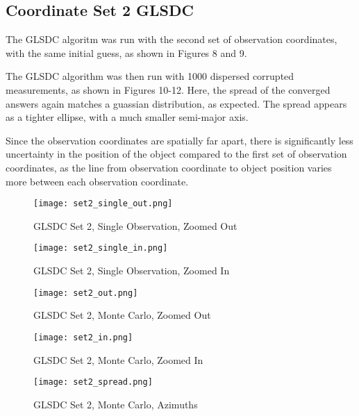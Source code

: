\documentclass{article}
\begin{document}
\subsection{Coordinate Set 2 GLSDC}
The GLSDC algoritm was run with the second set of observation coordinates, with the same initial guess, as shown in Figures 8 and 9.
\par The GLSDC algorithm was then run with 1000 dispersed corrupted measurements, as shown in Figures 10-12. Here, the spread of the converged answers again matches a guassian distribution, as expected. The spread appears as a tighter ellipse, with a much smaller semi-major axis. 
\par Since the observation coordinates are spatially far apart, there is significantly less uncertainty in the position of the object compared to the first set of observation coordinates, as the line from observation coordinate to object position varies more between each observation coordinate.

\begin{figure}[h]
    \centering
    \texttt{[image: set2\_single\_out.png]}
    \caption{GLSDC Set 2, Single Observation, Zoomed Out}
    \label{fig:enter-label}
\end{figure}

\begin{figure}[h]
    \centering
    \texttt{[image: set2\_single\_in.png]}
    \caption{GLSDC Set 2, Single Observation, Zoomed In}
    \label{fig:enter-label}
\end{figure}

\begin{figure}[h]
    \centering
    \texttt{[image: set2\_out.png]}
    \caption{GLSDC Set 2, Monte Carlo, Zoomed Out}
    \label{fig:enter-label}
\end{figure}

\begin{figure}[h]
    \centering
    \texttt{[image: set2\_in.png]}
    \caption{GLSDC Set 2, Monte Carlo, Zoomed In}
    \label{fig:enter-label}
\end{figure}

\begin{figure}[h]
    \centering
    \texttt{[image: set2\_spread.png]}
    \caption{GLSDC Set 2, Monte Carlo, Azimuths}
    \label{fig:enter-label}
\end{figure}

\clearpage
\end{document}
